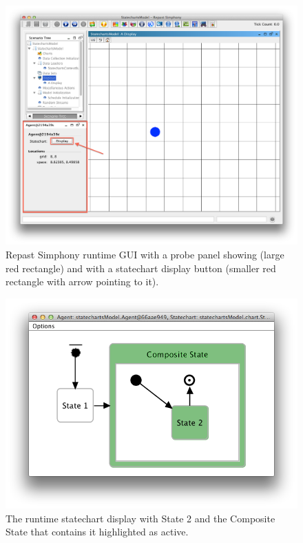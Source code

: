 \documentclass[11pt]{amsart}
\begin{document}
\begin{figure}
\begin{center}
\vspace{.2in}
\centerline {
\includegraphics[width=5in]{StatechartsImages/Probe.png}
}
\caption{Repast Simphony runtime GUI with a probe panel showing (large red rectangle) and with a statechart display button (smaller red rectangle with arrow pointing to it).}
\label{fig:probe}
\end{center}
\end{figure}

\begin{figure}
\begin{center}
\vspace{.2in}
\centerline {
\includegraphics[width=5in]{StatechartsImages/RuntimeStatechart.png}
}
\caption{The runtime statechart display with State 2 and the Composite State that contains it highlighted as active.}
\label{fig:runtimeStatechart}
\end{center}
\end{figure}
\clearpage
\end{document}
